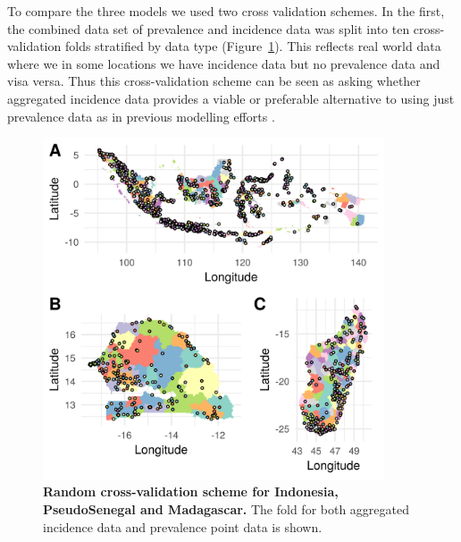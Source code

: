 \documentclass[10pt,letterpaper]{article}
\begin{document}
To compare the three models we used two cross validation schemes. 
In the first, the combined data set of prevalence and incidence data was split into ten cross-validation folds stratified by data type (Figure~\ref{fig:cv_random}).
This reflects real world data where we in some locations we have incidence data but no prevalence data and visa versa.
Thus this cross-validation scheme can be seen as asking whether aggregated incidence data provides a viable or preferable alternative to using just prevalence data as in previous modelling efforts \cite{bhatt2015effect}.


\begin{figure}[!h]
\centering

\includegraphics[width = 0.9\textwidth]{figures/random_crossvalidation_full.png} %

\caption{{\bf Random cross-validation scheme for Indonesia, PseudoSenegal and Madagascar.} The fold for both aggregated incidence data and prevalence point data is shown.}
\label{fig:cv_random}
\end{figure}
\end{document}

